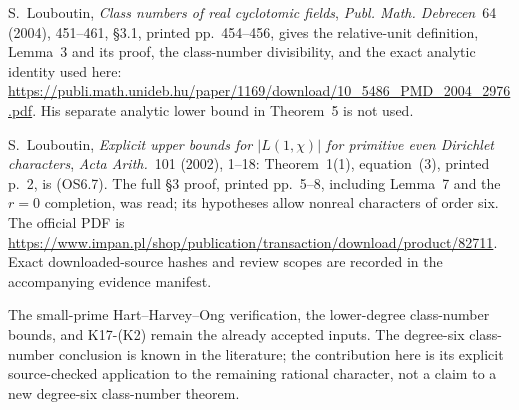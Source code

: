 S.~Louboutin, \emph{Class numbers of real cyclotomic fields},
\emph{Publ. Math. Debrecen}~64 (2004), 451--461,
\S3.1, printed pp.~454--456, gives the relative-unit
definition, Lemma~3 and its proof, the class-number
divisibility, and the exact analytic identity used here:
\url{https://publi.math.unideb.hu/paper/1169/download/10_5486_PMD_2004_2976.pdf}.
His separate analytic lower bound in Theorem~5 is not used.

S.~Louboutin, \emph{Explicit upper bounds for $|L(1,\chi)|$
for primitive even Dirichlet characters},
\emph{Acta Arith.}~101 (2002), 1--18:
Theorem~1(1), equation~(3), printed p.~2, is (OS6.7).
The full \S3 proof, printed pp.~5--8, including Lemma~7
and the $r=0$ completion, was read; its hypotheses allow
nonreal characters of order six.  The official PDF is
\url{https://www.impan.pl/shop/publication/transaction/download/product/82711}.
Exact downloaded-source hashes and review scopes are
recorded in the accompanying evidence manifest.

The small-prime Hart--Harvey--Ong verification, the lower-degree
class-number bounds, and K17-(K2) remain the already accepted
inputs.  The degree-six class-number conclusion is known in the
literature; the contribution here is its explicit source-checked
application to the remaining rational character, not a claim to
a new degree-six class-number theorem.

